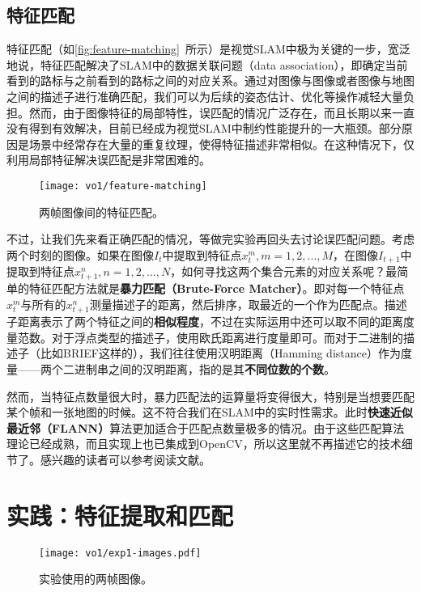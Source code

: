 \subsection{特征匹配}

特征匹配（如\autoref{fig:feature-matching}~所示）是视觉SLAM中极为关键的一步，宽泛地说，特征匹配解决了SLAM中的数据关联问题（data association），即确定当前看到的路标与之前看到的路标之间的对应关系。通过对图像与图像或者图像与地图之间的描述子进行准确匹配，我们可以为后续的姿态估计、优化等操作减轻大量负担。然而，由于图像特征的局部特性，误匹配的情况广泛存在，而且长期以来一直没有得到有效解决，目前已经成为视觉SLAM中制约性能提升的一大瓶颈。部分原因是场景中经常存在大量的重复纹理，使得特征描述非常相似。在这种情况下，仅利用局部特征解决误匹配是非常困难的。

\begin{figure}[!htp]
    \centering
    \texttt{[image: vo1/feature-matching]}
    \caption{两帧图像间的特征匹配。}
    \label{fig:feature-matching}
\end{figure}

不过，让我们先来看正确匹配的情况，等做完实验再回头去讨论误匹配问题。考虑两个时刻的图像。如果在图像$I_{t}$中提取到特征点$ x_{t}^{m}, m=1,2,...,M$，在图像$I_{t+1}$中提取到特征点$x_{t+1}^{n}, n=1,2,...,N$，如何寻找这两个集合元素的对应关系呢？最简单的特征匹配方法就是\textbf{暴力匹配（Brute-Force Matcher）}。即对每一个特征点$x_{t}^{m}$与所有的$x_{t+1}^{n}$测量描述子的距离，然后排序，取最近的一个作为匹配点。描述子距离表示了两个特征之间的\textbf{相似程度}，不过在实际运用中还可以取不同的距离度量范数。对于浮点类型的描述子，使用欧氏距离进行度量即可。而对于二进制的描述子（比如BRIEF这样的），我们往往使用汉明距离（Hamming distance）作为度量——两个二进制串之间的汉明距离，指的是其\textbf{不同位数的个数}。

然而，当特征点数量很大时，暴力匹配法的运算量将变得很大，特别是当想要匹配某个帧和一张地图的时候。这不符合我们在SLAM中的实时性需求。此时\textbf{快速近似最近邻（FLANN）}算法更加适合于匹配点数量极多的情况。由于这些匹配算法理论已经成熟，而且实现上也已集成到OpenCV，所以这里就不再描述它的技术细节了。感兴趣的读者可以参考阅读文献\cite{Muja2009}。

\section{实践：特征提取和匹配}
\begin{figure}[!htp]
	\centering
	\texttt{[image: vo1/exp1-images.pdf]}
	\caption{实验使用的两帧图像。}
	\label{fig:exp1-images}
\end{figure}

